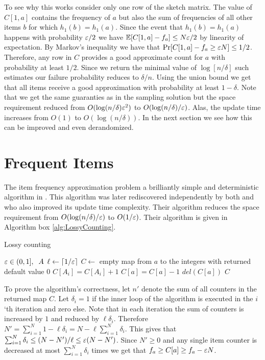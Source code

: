 \documentclass{article}
\begin{document}
To see why this works consider only one row of the sketch matrix.
The value of $C[1,a]$ contains the frequency of $a$ but also the sum of frequencies of all other items $b$ for which $h_1(b) = h_1(a)$.
Since the event that $h_1(b) = h_1(a)$ happens with probability $\varepsilon/2$ we have ${\mathbb E}[C[1,a]  - f_a] \le N\varepsilon/2$ by linearity of expectation. 
By Markov's inequality we have that $\Pr[C[1,a] - f_a \ge \varepsilon N] \le 1/2$.
Therefore, any row in $C$ provides a good approximate count for $a$ with probability at least $1/2$.
Since we return the minimal value of $\log[n/\delta]$ such estimates our failure probability reduces to $\delta/n$.
Using the union bound we get that all items receive a good approximation with probability at least $1-\delta$.
Note that we get the same guaranties as in the sampling solution but the space requirement reduced from 
$O(\log(n/\delta)\varepsilon^2)$ to $O(\log(n/\delta)/\varepsilon)$. Alas, the update time increases from $O(1)$ to $O(\log(n/\delta))$.
In the next section we see how this can be improved and even derandomized.

\section{Frequent Items}

The item frequency approximation problem a brilliantly simple and deterministic algorithm in \cite{Misra1982}.
This algorithm was later rediscovered independently by both \cite{DemaineLopezAlejandroMunro2002} and \cite{Karp03asimple} who 
also improved its update time complexity.
Their algorithm reduces the space requirement from $O(\log(n/\delta)/\varepsilon)$ to $O(1/\varepsilon)$.
Their algorithm is given in Algorithm box \ref{alg:LossyCounting}.
%
\begin{algorithm} 
\caption{Lossy counting}
\label{alg:LossyCounting}
\begin{algorithmic}
 $\varepsilon \in (0,1], \;\;A$ 
\STATE $\ell \leftarrow \lceil 1/\varepsilon \rceil$
\STATE $C \leftarrow$ empty map from $a$ to the integers with returned default value $0$
	\STATE $C[A_i] = C[A_i] +1$
			\STATE $C[a] = C[a]-1$
				\STATE $del(C[a])$
			\ENDIF
		\ENDFOR
	\ENDIF
\ENDFOR
{} $C$ 
\end{algorithmic}
\end{algorithm}
%
To prove the algorithm's correctness, let $n'$ denote the sum of all counters in the returned map $C$.
Let $\delta_i = 1$ if the inner loop of the algorithm is executed in the $i$`th iteration and zero else. 
Note that in each iteration the sum of counters is increased by $1$ and reduced by $\ell \delta_i$. 
Therefore $N' = \sum_{i=1}^{N} 1 - \ell \delta_i = N - \ell \sum_{i=1}^{N}\delta_i$. 
This gives that $\sum_{i=1}^{N}\delta_i \le (N-N')/\ell \le \varepsilon (N-N')$. 
Since $N' \ge 0$ and any single item counter is decreased at most $\sum_{i=1}^{N}\delta_i$ times we get that $f_a \ge C[a] \ge f_a - \varepsilon N$.
\end{document}
